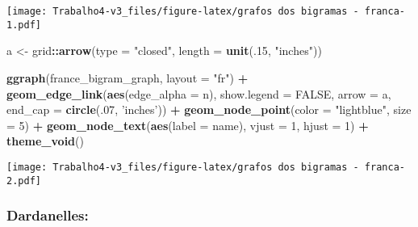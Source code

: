 \documentclass[]{article}
\newenvironment{Shaded}{\begin{snugshade}}{\end{snugshade}}
\newcommand{\DataTypeTok}[1]{\textcolor[rgb]{0.13,0.29,0.53}{#1}}
\newcommand{\DecValTok}[1]{\textcolor[rgb]{0.00,0.00,0.81}{#1}}
\newcommand{\KeywordTok}[1]{\textcolor[rgb]{0.13,0.29,0.53}{\textbf{#1}}}
\newcommand{\NormalTok}[1]{#1}
\newcommand{\OperatorTok}[1]{\textcolor[rgb]{0.81,0.36,0.00}{\textbf{#1}}}
\newcommand{\OtherTok}[1]{\textcolor[rgb]{0.56,0.35,0.01}{#1}}
\newcommand{\StringTok}[1]{\textcolor[rgb]{0.31,0.60,0.02}{#1}}
\begin{document}
\texttt{[image: Trabalho4-v3\_files/figure-latex/grafos dos bigramas - franca-1.pdf]}

\begin{Shaded}
\begin{Highlighting}[]
\NormalTok{a <-}\StringTok{ }\NormalTok{grid}\OperatorTok{::}\KeywordTok{arrow}\NormalTok{(}\DataTypeTok{type =} \StringTok{"closed"}\NormalTok{, }\DataTypeTok{length =} \KeywordTok{unit}\NormalTok{(.}\DecValTok{15}\NormalTok{, }\StringTok{"inches"}\NormalTok{))}

\KeywordTok{ggraph}\NormalTok{(france_bigram_graph, }\DataTypeTok{layout =} \StringTok{"fr"}\NormalTok{) }\OperatorTok{+}
\StringTok{  }\KeywordTok{geom_edge_link}\NormalTok{(}\KeywordTok{aes}\NormalTok{(}\DataTypeTok{edge_alpha =}\NormalTok{ n), }\DataTypeTok{show.legend =} \OtherTok{FALSE}\NormalTok{,}
                 \DataTypeTok{arrow =}\NormalTok{ a, }\DataTypeTok{end_cap =} \KeywordTok{circle}\NormalTok{(.}\DecValTok{07}\NormalTok{, }\StringTok{'inches'}\NormalTok{)) }\OperatorTok{+}
\StringTok{  }\KeywordTok{geom_node_point}\NormalTok{(}\DataTypeTok{color =} \StringTok{"lightblue"}\NormalTok{, }\DataTypeTok{size =} \DecValTok{5}\NormalTok{) }\OperatorTok{+}
\StringTok{  }\KeywordTok{geom_node_text}\NormalTok{(}\KeywordTok{aes}\NormalTok{(}\DataTypeTok{label =}\NormalTok{ name), }\DataTypeTok{vjust =} \DecValTok{1}\NormalTok{, }\DataTypeTok{hjust =} \DecValTok{1}\NormalTok{) }\OperatorTok{+}
\StringTok{  }\KeywordTok{theme_void}\NormalTok{()}
\end{Highlighting}
\end{Shaded}

\texttt{[image: Trabalho4-v3\_files/figure-latex/grafos dos bigramas - franca-2.pdf]}

\hypertarget{dardanelles-5}{%
\subsubsection{Dardanelles:}\label{dardanelles-5}}

\begin{Shaded}
\end{Shaded}
\end{document}

